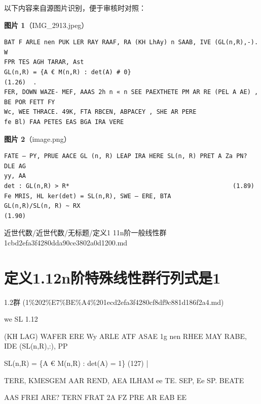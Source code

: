 \begin{note}
以下内容来自源图片识别，便于审核时对照：

\textbf{图片 1}（IMG\_2913.jpeg）
\begin{Verbatim}[fontsize=\small]
BAT F ARLE nen PUK LER RAY RAAF, RA (KH LhAy) n SAAB, IVE (GL(n,R),-). W
FPR TES AGH TARAR, Ast
GL(n,R) = {A € M(n,R) : det(A) # 0}                               (1.26)  .
FER, DOWN WAZE- MEF, AAAS 2h n « n SEE PAEXTHETE PM AR RE (PEL A AE) , BE POR FETT FY
Wc, WEE THRACE. 49K, FTA RBCEN, ABPACEY , SHE AR PERE
fe Bl) FAA PETES EAS BGA IRA VERE
\end{Verbatim}

\textbf{图片 2}（image.png）
\begin{Verbatim}[fontsize=\small]
FATE — PY, PRUE AACE GL (n, R) LEAP IRA HERE SL(n, R) PRET A Za PN? DLE AG
yy, AA
det : GL(n,R) > R*                                             (1.89)
Fe MRIS, HL ker(det) = SL(n,R), SWE — ERE, BTA
GL(n,R)/SL(n, R) ~ RX                                                  (1.90)
\end{Verbatim}

\end{note}

\begin{note}[来源路径]

近世代数/近世代数/无标题/定义1 11n阶一般线性群 1cbd2efa3f4280dda90ce3802a0d1200.md

\end{note}

\section*{定义1.12n阶特殊线性群行列式是1}

\begin{note}[来源上级主题]

1.2群 (1\%202\%E7\%BE\%A4\%201ecd2efa3f4280cf8df9c881d186f2a4.md)

\end{note}

\begin{definition}[定义1.12n阶特殊线性群行列式是1]

we SL 1.12

(KH LAG) WAFER ERE Wy ARLE ATF ASAE 1g nen RHEE MAY RABE, IDE (SL(n,R),:), PP

SL(n,R) = \{A € M(n,R) : det(A) = 1\}             (127) |

TERE, KMESGEM AAR REND, AEA ILHAM ee TE. SEP, Ee SP. BEATE

AAS FREI ARE? TERN FRAT 2A FZ PRE AR EAB EE

\end{definition}

